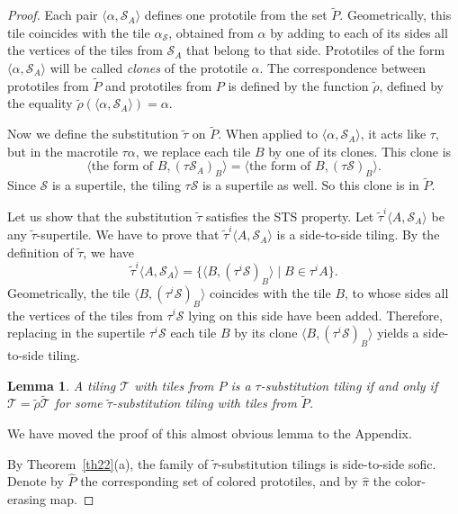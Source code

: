 \documentclass[12pt]{article}
\newtheorem{lemma}{Lemma}
\theoremstyle{remark}
\newcommand{\pair}[1]{\langle #1\rangle}
\begin{document}
\begin{proof}
Each pair $\pair{\alpha,\mathcal S_A}$ defines one prototile from the set $\tilde P$.
Geometrically, this tile coincides with the tile $\alpha_{\mathcal S}$, obtained from $\alpha$ by adding to each of its sides
all the vertices of the tiles from $\mathcal S_A$ that belong to that side. Prototiles of the form $\pair{\alpha,\mathcal S_A}$
will be called \emph{clones} of the prototile $\alpha$. 
The correspondence between
prototiles from $\tilde P$ and prototiles from $P$ is defined by the function $\tilde\rho$,
defined by the equality $\tilde\rho( \pair{\alpha,\mathcal S_A})=\alpha$.

Now we define the substitution $\tilde\tau$ on $\tilde P$. When applied to $\pair{\alpha,\mathcal S_A}$,
it acts like $\tau$, but
in the macrotile $\tau\alpha $, we replace each tile $B$ by one of its clones. This clone is 
$$
\pair{\text{the form of }B,(\tau\mathcal S_A)_B}=\pair{\text{the form of }B,(\tau\mathcal S)_B}.
$$
Since $\mathcal S$ is a supertile, the tiling $\tau\mathcal S$ is a
supertile as well. So this clone is in $\tilde P$.

Let us show that the substitution $\tilde\tau$ satisfies the STS property.
Let $\tilde\tau^i\pair{A,\mathcal S_A}$ be any $\tilde\tau$-supertile. 
We have to prove that $\tilde\tau^i\pair{A,\mathcal S_A}$ is a side-to-side tiling.
By the definition of $\tilde\tau$, we have
$$
\tilde\tau^i\pair{A,\mathcal S_A}=\{\pair{B,(\tau^i\mathcal S)_B}\mid B\in\tau^i A\}.
$$
Geometrically, the tile $\pair{B,(\tau^i\mathcal S)_B}$ coincides
with the tile $B$, to whose sides all the vertices of the tiles from
$\tau^i\mathcal S$ lying on this side have been added.
Therefore, replacing in the supertile $\tau^i \mathcal S$
each tile $B$ by its clone $\pair{B,(\tau^i\mathcal S)_B}$
yields a side-to-side tiling.



\begin{lemma}\label{l-tilde}
A tiling $\mathcal T$ with tiles from $P$ is a $\tau$-substitution tiling if and only if
$\mathcal T=\tilde\rho\tilde{\mathcal T}$ for some $\tilde\tau$-substitution
tiling with tiles from $\tilde P$.
\end{lemma}
We have moved the proof of this almost obvious lemma to the Appendix.

By Theorem~\ref{th22}(a),
the family of $\tilde\tau$-substitution tilings is side-to-side sofic. Denote by
$\hat P$ the corresponding set of colored prototiles, and by
$\hat\pi$ the color-erasing map.


\end{proof}
\end{document}
